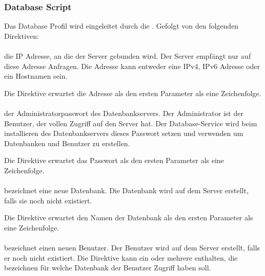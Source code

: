 \subsubsection{Database Script}

Das Database Profil wird eingeleitet durch die . Gefolgt von
den folgenden Direktiven:

\paragraph{}

die IP Adresse, an die der Server gebunden wird. Der Server empfängt nur auf diese
Adresse Anfragen. Die Adresse kann entweder eine IPv4, IPv6 Adresse oder
ein Hostnamen sein.

Die Direktive erwartet die Adresse als den ersten Parameter als eine Zeichenfolge.

\paragraph{}

der Administratorpasswort des Datenbankservers. Der Administrator ist der Benutzer,
der vollen Zugriff auf den Server hat. Der Database-Service wird beim installieren
des Datenbankservers dieses Passwort setzen und verwenden um Datenbanken und Benutzer
zu erstellen.

Die Direktive erwartet das Passwort als den ersten Parameter als eine Zeichenfolge.

\paragraph{}

bezeichnet eine neue Datenbank. Die Datenbank wird auf dem Server erstellt, falls
sie noch nicht existiert.

Die Direktive erwartet den Namen der Datenbank als den ersten Parameter als eine Zeichenfolge.

\paragraph{}

bezeichnet einen neuen Benutzer. Der Benutzer wird auf dem Server erstellt, falls er
noch nicht existiert. Die Direktive kann ein oder mehrere 
enthalten, die bezeichnen für welche Datenbank der Benutzer Zugriff haben soll.

